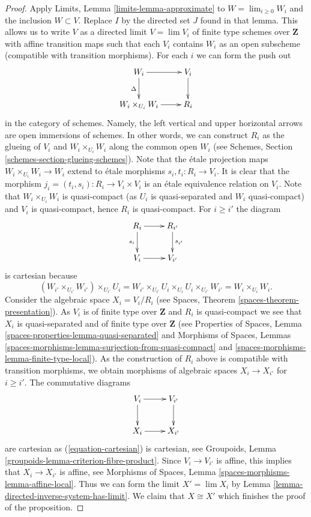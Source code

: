 \documentclass{stacks-project}
\theoremstyle{plain}
\theoremstyle{definition}
\theoremstyle{remark}
\numberwithin{equation}{subsection}
\def\lim{\mathop{\mathrm{lim}}\nolimits}
\begin{document}
\begin{proof}
\medskip\noindent
Apply Limits, Lemma \ref{limits-lemma-approximate} to
$W = \lim_{i \geq 0} W_i$ and the inclusion $W \subset V$. Replace $I$
by the directed set $J$ found in that lemma. This allows us
to write $V$ as a directed limit $V = \lim V_i$ of finite type schemes over
$\mathbf{Z}$ with affine transition maps such that each $V_i$ contains
$W_i$ as an open subscheme (compatible with transition morphisms).
For each $i$ we can form the push out
$$
\xymatrix{
W_i \ar[r] \ar[d]_\Delta & V_i \ar[d] \\
W_i \times_{U_i} W_i \ar[r] & R_i
}
$$
in the category of schemes. Namely, the left vertical and upper horizontal
arrows are open immersions of schemes. In other words, we can construct
$R_i$ as the glueing of $V_i$ and $W_i \times_{U_i} W_i$ along the common open
$W_i$ (see Schemes, Section \ref{schemes-section-glueing-schemes}). Note that
the \'etale projection maps $W_i \times_{U_i} W_i \to W_i$ extend
to \'etale morphisms $s_i, t_i : R_i \to V_i$. It is clear that the
morphism $j_i = (t_i, s_i) : R_i \to V_i \times V_i$ is an \'etale
equivalence relation on $V_i$. Note that $W_i \times_{U_i} W_i$ is
quasi-compact (as $U_i$ is quasi-separated and $W_i$ quasi-compact)
and $V_i$ is quasi-compact, hence $R_i$ is quasi-compact. For
$i \geq i'$ the diagram
\begin{equation}
\label{equation-cartesian}
\vcenter{
\xymatrix{
R_i \ar[r] \ar[d]_{s_i} & R_{i'} \ar[d]^{s_{i'}} \\
V_i \ar[r] & V_{i'}
}
}
\end{equation}
is cartesian because
$$
(W_{i'} \times_{U_{i'}} W_{i'}) \times_{U_{i'}} U_i =
W_{i'} \times_{U_{i'}} U_i \times_{U_i} U_i \times_{U_{i'}} W_{i'} =
W_i \times_{U_i} W_i.
$$
Consider the algebraic space $X_i = V_i/R_i$ (see
Spaces, Theorem \ref{spaces-theorem-presentation}).
As $V_i$ is of finite type over $\mathbf{Z}$ and $R_i$ is quasi-compact
we see that $X_i$ is quasi-separated and of finite type over $\mathbf{Z}$
(see
Properties of Spaces, Lemma \ref{spaces-properties-lemma-quasi-separated}
and
Morphisms of Spaces, Lemmas
\ref{spaces-morphisms-lemma-surjection-from-quasi-compact} and
\ref{spaces-morphisms-lemma-finite-type-local}).
As the construction of $R_i$ above is compatible
with transition morphisms, we obtain morphisms of algebraic spaces
$X_i \to X_{i'}$ for $i \geq i'$. The commutative diagrams
$$
\xymatrix{
V_i \ar[r] \ar[d] & V_{i'} \ar[d] \\
X_i \ar[r] & X_{i'}
}
$$
are cartesian as (\ref{equation-cartesian}) is cartesian, see
Groupoids, Lemma \ref{groupoids-lemma-criterion-fibre-product}.
Since $V_i \to V_{i'}$ is affine, this implies that $X_i \to X_{i'}$
is affine, see
Morphisms of Spaces, Lemma \ref{spaces-morphisms-lemma-affine-local}.
Thus we can form the limit $X' = \lim X_i$ by
Lemma \ref{lemma-directed-inverse-system-has-limit}.
We claim that $X \cong X'$ which finishes the proof of the proposition.


\end{proof}
\end{document}
